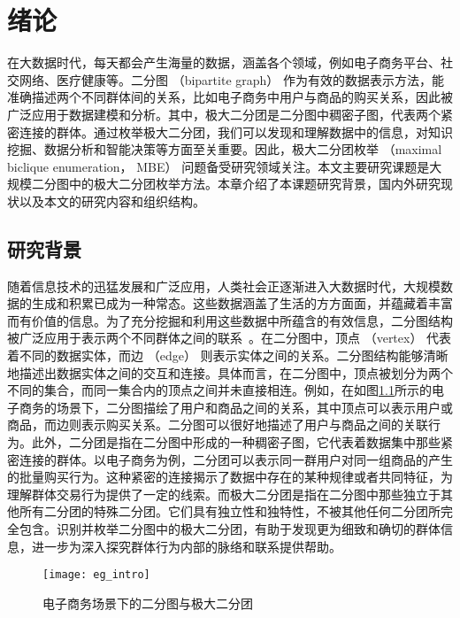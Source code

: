 \chapter{绪论}

在大数据时代，每天都会产生海量的数据，涵盖各个领域，例如电子商务平台、社交网络、医疗健康等。二分图 （bipartite graph） 作为有效的数据表示方法，能准确描述两个不同群体间的关系，比如电子商务中用户与商品的购买关系，因此被广泛应用于数据建模和分析。其中，极大二分团是二分图中稠密子图，代表两个紧密连接的群体。通过枚举极大二分团，我们可以发现和理解数据中的信息，对知识挖掘、数据分析和智能决策等方面至关重要。因此，极大二分团枚举 （maximal biclique enumeration， MBE） 问题备受研究领域关注。本文主要研究课题是大规模二分图中的极大二分团枚举方法。本章介绍了本课题研究背景，国内外研究现状以及本文的研究内容和组织结构。

\section{研究背景}

随着信息技术的迅猛发展和广泛应用，人类社会正逐渐进入大数据时代，大规模数据的生成和积累已成为一种常态。这些数据涵盖了生活的方方面面，并蕴藏着丰富而有价值的信息。为了充分挖掘和利用这些数据中所蕴含的有效信息，二分图结构被广泛应用于表示两个不同群体之间的联系~\cite{bipartite22}。在二分图中，顶点 （vertex） 代表着不同的数据实体，而边 （edge） 则表示实体之间的关系。二分图结构能够清晰地描述出数据实体之间的交互和连接。具体而言，在二分图中，顶点被划分为两个不同的集合，而同一集合内的顶点之间并未直接相连。例如，在如图\ref{fig:eg_intro}所示的电子商务的场景下，二分图描绘了用户和商品之间的关系，其中顶点可以表示用户或商品，而边则表示购买关系。二分图可以很好地描述了用户与商品之间的关联行为。此外，二分团是指在二分图中形成的一种稠密子图，它代表着数据集中那些紧密连接的群体。以电子商务为例，二分团可以表示同一群用户对同一组商品的产生的批量购买行为。这种紧密的连接揭示了数据中存在的某种规律或者共同特征，为理解群体交易行为提供了一定的线索。而极大二分团是指在二分图中那些独立于其他所有二分团的特殊二分团。它们具有独立性和独特性，不被其他任何二分团所完全包含。识别并枚举二分图中的极大二分团，有助于发现更为细致和确切的群体信息，进一步为深入探究群体行为内部的脉络和联系提供帮助。

\begin{figure} [ht]
  \centering
  \vspace{0.1in}
  \texttt{[image: eg\_intro]}
  \vspace{0.1in}
  \caption{电子商务场景下的二分图与极大二分团}
  \label{fig:eg_intro}
\end{figure}


